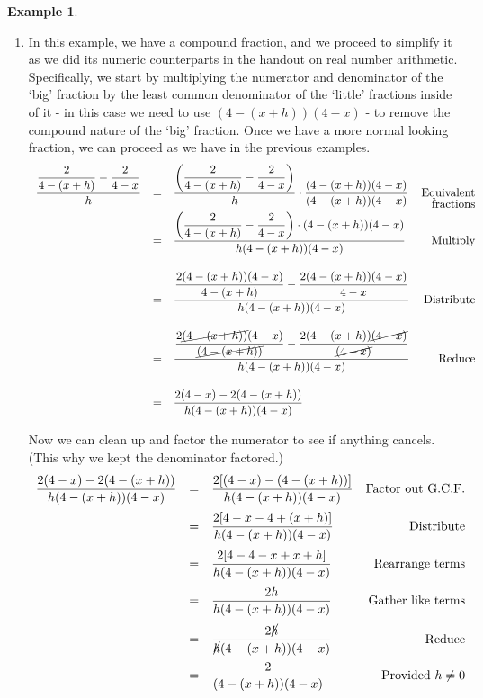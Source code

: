 \documentclass[11pt]{article}
\theoremstyle{definition}  %
\newtheorem{ex}{\bf Example}
\begin{document}
\begin{ex}
\begin{enumerate}
\item  In this example, we have a compound fraction, and we proceed to simplify it as we did its numeric counterparts in the handout on real number arithmetic.  Specifically, we start by multiplying the numerator and denominator of the `big' fraction by the least common denominator of the `little' fractions inside of it - in this case we need to use $(4-(x+h))(4-x)$ - to remove the compound nature of the `big' fraction.  Once we have a more normal looking fraction, we can proceed as we have in the previous examples.\[ \begin{array}{rclr}

\dfrac{\dfrac{2}{4 - (x+h)} - \dfrac{2}{4-x}}{h} & = & \dfrac{\left(\dfrac{2}{4 - (x+h)} - \dfrac{2}{4-x}\right)}{h}  \cdot \dfrac{(4-(x+h))(4-x)}{(4-(x+h))(4-x)} & \text{Equivalent} \\ [-8pt]
                                                 &    &                                                                                                            & \text{fractions} \\

& = & \dfrac{\left(\dfrac{2}{4 - (x+h)} - \dfrac{2}{4-x}\right) \cdot (4-(x+h))(4-x) }{h (4-(x+h))(4-x)} & \text{Multiply} \\ [20pt]

& = & \dfrac{\dfrac{2(4-(x+h))(4-x)}{4 - (x+h)} - \dfrac{2(4-(x+h))(4-x)}{4-x}}{h (4-(x+h))(4-x)} & \text{Distribute} \\ [20pt]


& = & \dfrac{\dfrac{2\cancel{(4-(x+h))}(4-x)}{\cancel{(4 - (x+h))}} - \dfrac{2(4-(x+h))\cancel{(4-x)}}{\cancel{(4-x)}}}{h (4-(x+h))(4-x)} & \text{Reduce} \\ [20pt]


& = & \dfrac{2(4-x) - 2(4-(x+h))}{h(4-(x+h))(4-x)} & \\ 

\end{array}\]

Now we can clean up and factor the numerator to see if anything cancels.  (This why we kept the denominator factored.)\[ \begin{array}{rclr}

\dfrac{2(4-x) - 2(4-(x+h))}{h(4-(x+h))(4-x)} & = & \dfrac{2[(4-x) - (4-(x+h))]}{h(4-(x+h))(4-x)} & \text{Factor out G.C.F.} \\ [12pt]
																						 & = & \dfrac{2[4-x - 4+(x+h)]}{h(4-(x+h))(4-x)} & \text{Distribute} \\ [12pt]
																						 & = & \dfrac{2[4- 4 - x+x+h]}{h(4-(x+h))(4-x)} & \text{Rearrange terms} \\ [12pt]
																						 & = & \dfrac{2h}{h(4-(x+h))(4-x)} & \text{Gather like terms} \\ [12pt]
																						 & = & \dfrac{2\cancel{h}}{\cancel{h}(4-(x+h))(4-x)} & \text{Reduce} \\ [12pt]
																						& = & \dfrac{2}{(4-(x+h))(4-x)} & \text{Provided $h \neq 0$} \\
\end{array}\]


\end{enumerate}
\end{ex}
\end{document}
